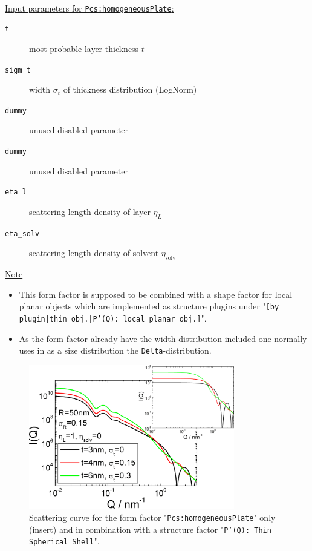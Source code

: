 \hspace{1pt}\\
\underline{Input parameters for \texttt{Pcs:homogeneousPlate}:}
\begin{description}
    \item[\texttt{t}] most probable layer thickness $t$
    \item[\texttt{sigm\_t}] width $\sigma_t$ of thickness distribution (LogNorm)
    \item[\texttt{dummy}] unused disabled parameter
    \item[\texttt{dummy}] unused disabled parameter
    \item[\texttt{eta\_l}] scattering length density of layer $\eta_L$
    \item[\texttt{eta\_solv}] scattering length density of solvent $\eta_\textrm{solv}$
\end{description}

\noindent
\underline{Note}
\begin{itemize}
  \item This form factor is supposed to be combined with a shape factor for
local planar objects which are implemented as structure  plugins
under "\texttt{[by plugin|thin obj.|P'(Q): local planar
obj.]}".
\item As the form factor already have the width distribution included one normally uses in \SASfit as a size distribution
the \texttt{Delta}-distribution.
\end{itemize}

\begin{figure}[htb]
\begin{center}
\includegraphics[width=0.8\textwidth,height=0.55\textwidth]{../images/form_factor/anisotropic/localplanarIQ.png}
\end{center}
\caption{Scattering curve for the form factor "\texttt{Pcs:homogeneousPlate}" only (insert) and
in combination with a structure factor "\texttt{P'(Q): Thin Spherical Shell}".}
\label{fig_IQ:homogeneousXS}
\end{figure}

